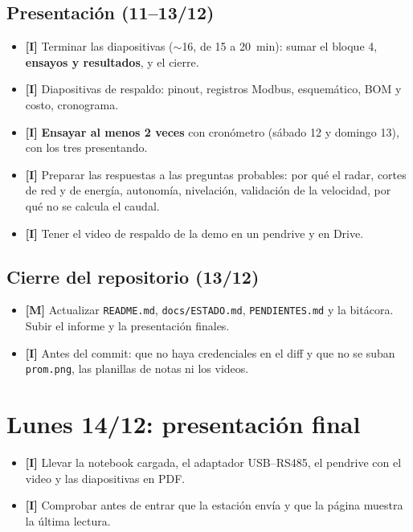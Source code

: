 \documentclass[11pt,a4paper]{article}
\newcommand{\imp}{\textcolor{rojo}{\textbf{[I]}}}
\newcommand{\mej}{\textcolor{ambar}{\textbf{[M]}}}
\begin{document}
\subsection{Presentación (11--13/12)}
\begin{itemize}
  \item \imp{} Terminar las diapositivas ($\sim$16, de 15 a 20~min): sumar el bloque 4,
        \textbf{ensayos y resultados}, y el cierre.
  \item \imp{} Diapositivas de respaldo: pinout, registros Modbus, esquemático, BOM y costo,
        cronograma.
  \item \imp{} \textbf{Ensayar al menos 2 veces} con cronómetro (sábado 12 y domingo 13), con los
        tres presentando.
  \item \imp{} Preparar las respuestas a las preguntas probables: por qué el radar, cortes de red y
        de energía, autonomía, nivelación, validación de la velocidad, por qué no se calcula el
        caudal.
  \item \imp{} Tener el video de respaldo de la demo en un pendrive y en Drive.
\end{itemize}

\subsection{Cierre del repositorio (13/12)}
\begin{itemize}
  \item \mej{} Actualizar \texttt{README.md}, \texttt{docs/ESTADO.md}, \texttt{PENDIENTES.md} y la
        bitácora. Subir el informe y la presentación finales.
  \item \imp{} Antes del commit: que no haya credenciales en el diff y que no se suban
        \texttt{prom.png}, las planillas de notas ni los videos.
\end{itemize}

\section{Lunes 14/12: presentación final}
\begin{itemize}
  \item \imp{} Llevar la notebook cargada, el adaptador USB--RS485, el pendrive con el video y las
        diapositivas en PDF.
  \item \imp{} Comprobar antes de entrar que la estación envía y que la página muestra la última
        lectura.
\end{itemize}
\end{document}

